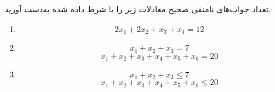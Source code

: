 \EXERCISE
تعداد جواب‌های نامنفی صحیح معادلات زیر را با شرط داده شده به‌دست آورید.
\begin{enumerate}
\item
$$2x_1 + 2x_2 + x_3 + x_4 = 12$$
\item
$$x_1 + x_2 + x_3 = 7$$
$$x_1 + x_2 + x_3 + x_4 + x_5 + x_6 = 20$$
\item
$$x_1 + x_2 + x_3 \leq 7$$
$$x_1 + x_2 + x_3 + x_4 + x_5 + x_6 \leq 20$$
\end{enumerate}